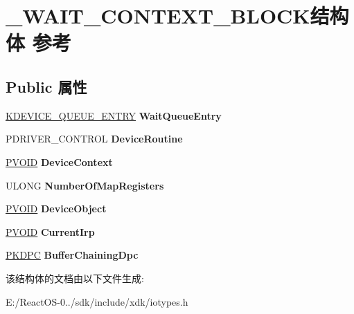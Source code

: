 \hypertarget{struct___w_a_i_t___c_o_n_t_e_x_t___b_l_o_c_k}{}\section{\+\_\+\+W\+A\+I\+T\+\_\+\+C\+O\+N\+T\+E\+X\+T\+\_\+\+B\+L\+O\+C\+K结构体 参考}
\label{struct___w_a_i_t___c_o_n_t_e_x_t___b_l_o_c_k}
\subsection*{Public 属性}
\begin{DoxyCompactItemize}
\item 
\mbox{\label{struct___w_a_i_t___c_o_n_t_e_x_t___b_l_o_c_k_a9d1d806f4ea0ca28fbed8b29b6a827b7}} 
\hyperlink{struct___k_d_e_v_i_c_e___q_u_e_u_e___e_n_t_r_y}{K\+D\+E\+V\+I\+C\+E\+\_\+\+Q\+U\+E\+U\+E\+\_\+\+E\+N\+T\+RY} {\bfseries Wait\+Queue\+Entry}
\item 
\mbox{\label{struct___w_a_i_t___c_o_n_t_e_x_t___b_l_o_c_k_ad855352f3b86f05baa03d8ff08f4b2e3}} 
P\+D\+R\+I\+V\+E\+R\+\_\+\+C\+O\+N\+T\+R\+OL {\bfseries Device\+Routine}
\item 
\mbox{\label{struct___w_a_i_t___c_o_n_t_e_x_t___b_l_o_c_k_aba14034795960c9dbdcb89567e33f700}} 
\hyperlink{interfacevoid}{P\+V\+O\+ID} {\bfseries Device\+Context}
\item 
\mbox{\label{struct___w_a_i_t___c_o_n_t_e_x_t___b_l_o_c_k_a68191c6c8a1802458b18113fcbe96ae6}} 
U\+L\+O\+NG {\bfseries Number\+Of\+Map\+Registers}
\item 
\mbox{\label{struct___w_a_i_t___c_o_n_t_e_x_t___b_l_o_c_k_af917466c65120856277a46ed2103a1c3}} 
\hyperlink{interfacevoid}{P\+V\+O\+ID} {\bfseries Device\+Object}
\item 
\mbox{\label{struct___w_a_i_t___c_o_n_t_e_x_t___b_l_o_c_k_aacfbabdd1042981d982b1d73c02322fa}} 
\hyperlink{interfacevoid}{P\+V\+O\+ID} {\bfseries Current\+Irp}
\item 
\mbox{\label{struct___w_a_i_t___c_o_n_t_e_x_t___b_l_o_c_k_a462257c360c881c0949b2233fb27eac3}} 
\hyperlink{struct___k_d_p_c}{P\+K\+D\+PC} {\bfseries Buffer\+Chaining\+Dpc}
\end{DoxyCompactItemize}


该结构体的文档由以下文件生成\+:\begin{DoxyCompactItemize}
\item 
E\+:/\+React\+O\+S-\/0../sdk/include/xdk/iotypes.\+h\end{DoxyCompactItemize}
